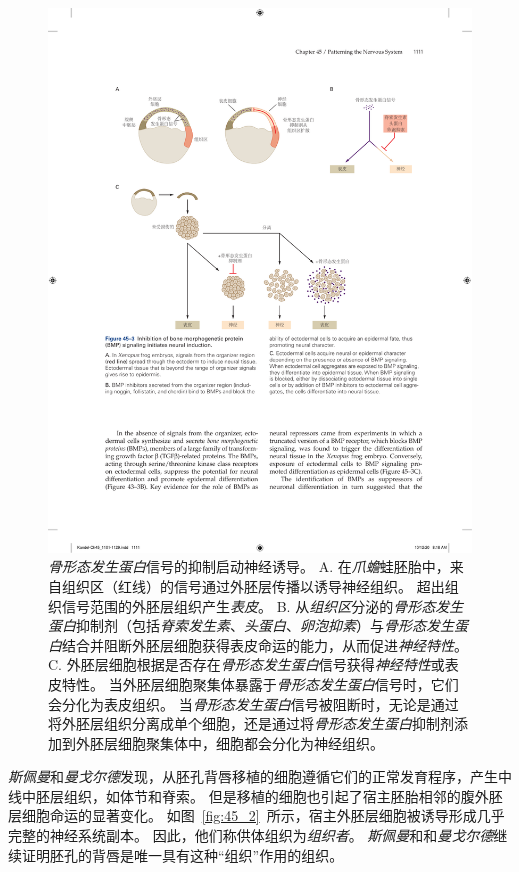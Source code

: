 \begin{figure}[htbp]
	\centering
	\includegraphics[width=1.0\linewidth]{chap45/fig_45_3}
	\caption{\textit{骨形态发生蛋白}信号的抑制启动神经诱导。
		A. 在\textit{爪蟾}蛙胚胎中，来自组织区（红线）的信号通过外胚层传播以诱导神经组织。
		超出组织信号范围的外胚层组织产生\textit{表皮}。
		B. 从\textit{组织区}分泌的\textit{骨形态发生蛋白}抑制剂（包括\textit{脊索发生素}、\textit{头蛋白}、\textit{卵泡抑素}）与\textit{骨形态发生蛋白}结合并阻断外胚层细胞获得表皮命运的能力，从而促进\textit{神经特性}。
		C. 外胚层细胞根据是否存在\textit{骨形态发生蛋白}信号获得\textit{神经特性}或表皮特性。
		当外胚层细胞聚集体暴露于\textit{骨形态发生蛋白}信号时，它们会分化为表皮组织。
		当\textit{骨形态发生蛋白}信号被阻断时，无论是通过将外胚层组织分离成单个细胞，还是通过将\textit{骨形态发生蛋白}抑制剂添加到外胚层细胞聚集体中，细胞都会分化为神经组织。}
	\label{fig:45_3}
\end{figure}


\textit{斯佩曼}和\textit{曼戈尔德}发现，从胚孔背唇移植的细胞遵循它们的正常发育程序，产生中线中胚层组织，如体节和脊索。
但是移植的细胞也引起了宿主胚胎相邻的腹外胚层细胞命运的显著变化。
如图~\ref{fig:45_2}~所示，宿主外胚层细胞被诱导形成几乎完整的神经系统副本。
因此，他们称供体组织为\textit{组织者}。
\textit{斯佩曼}和和\textit{曼戈尔德}继续证明胚孔的背唇是唯一具有这种“组织”作用的组织。


